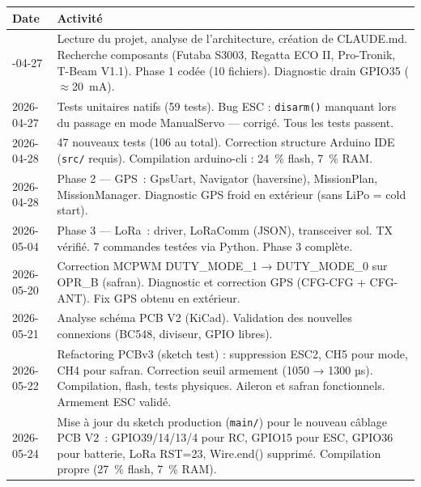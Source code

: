 \documentclass[12pt,a4paper]{article}
\begin{document}
\begin{longtable}{C{2.5cm} L{10cm}}
  \toprule
  \textcolor{tableheadfg}{\textbf{Date}} &
  \textcolor{tableheadfg}{\textbf{Activité}} \\
  \midrule
  \endhead
  \bottomrule
  -04-27 & Lecture du projet, analyse de l'architecture, création de CLAUDE.md.
              Recherche composants (Futaba S3003, Regatta ECO II, Pro-Tronik,
              T-Beam V1.1). Phase 1 codée (10 fichiers). Diagnostic drain GPIO35
              ($\approx$20~mA). \\[3pt]
  2026-04-27 & Tests unitaires natifs (59 tests). Bug ESC : \texttt{disarm()} manquant
              lors du passage en mode ManualServo — corrigé. Tous les tests passent. \\[3pt]
  2026-04-28 & 47 nouveaux tests (106 au total). Correction structure Arduino IDE
              (\texttt{src/} requis). Compilation arduino-cli : 24~\% flash, 7~\% RAM. \\[3pt]
  2026-04-28 & Phase 2 — GPS~: GpsUart, Navigator (haversine), MissionPlan,
              MissionManager. Diagnostic GPS froid en extérieur (sans LiPo = cold start). \\[3pt]
  2026-05-04 & Phase 3 — LoRa~: driver, LoRaComm (JSON), transceiver sol.
              TX vérifié. 7 commandes testées via Python. Phase 3 complète. \\[3pt]
  2026-05-20 & Correction MCPWM DUTY\_MODE\_1 → DUTY\_MODE\_0 sur OPR\_B (safran).
              Diagnostic et correction GPS (CFG-CFG + CFG-ANT). Fix GPS obtenu en extérieur. \\[3pt]
  2026-05-21 & Analyse schéma PCB V2 (KiCad). Validation des nouvelles connexions
              (BC548, diviseur, GPIO libres). \\[3pt]
  2026-05-22 & Refactoring PCBv3 (sketch test) : suppression ESC2, CH5 pour mode,
              CH4 pour safran. Correction seuil armement (1050 → 1300 µs).
              Compilation, flash, tests physiques. Aileron et safran fonctionnels.
              Armement ESC validé. \\[3pt]
  2026-05-24 & Mise à jour du sketch production (\texttt{main/}) pour le nouveau
              câblage PCB V2~: GPIO39/14/13/4 pour RC, GPIO15 pour ESC, GPIO36
              pour batterie, LoRa RST=23, Wire.end() supprimé.
              Compilation propre (27~\% flash, 7~\% RAM). \\
\end{longtable}
\end{document}
